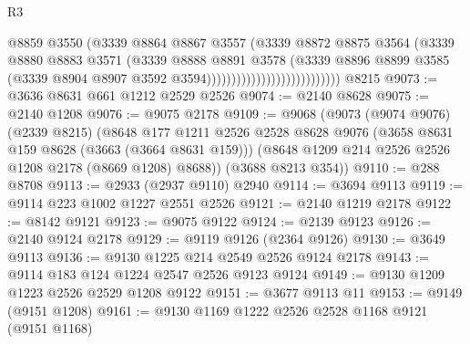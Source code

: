 \begin{lexlean}{R3}
\begin{coremodule}
                                              @8859
                                              @3550
                                              (@3339
                                                @8864
                                                @8867
                                                @3557
                                                (@3339
                                                  @8872
                                                  @8875
                                                  @3564
                                                  (@3339
                                                    @8880
                                                    @8883
                                                    @3571
                                                    (@3339
                                                      @8888
                                                      @8891
                                                      @3578
                                                      (@3339
                                                        @8896
                                                        @8899
                                                        @3585
                                                        (@3339
                                                          @8904
                                                          @8907
                                                          @3592
                                                          @3594)))))))))))))))))))))))))))
    @8215
@9073 := @3636 @8631 @661 @1212 @2529 @2526
@9074 := @2140 @8628
@9075 := @2140 @1208
@9076 := @9075 @2178
@9109 := @9068
    (@9073
      (@9074 @9076)
      (@2339 @8215)
      (@8648
        @177
        @1211
        @2526
        @2528
        @8628
        @9076
        (@3658 @8631 @159 @8628 (@3663 (@3664 @8631 @159)))
        (@8648 @1209 @214 @2526 @2526 @1208 @2178 (@8669 @1208) @8688))
      (@3688 @8213 @354))
@9110 := @288 @8708
@9113 := @2933 (@2937 @9110) @2940
@9114 := @3694 @9113
@9119 := @9114 @223 @1002 @1227 @2551 @2526
@9121 := @2140 @1219 @2178
@9122 := @8142 @9121
@9123 := @9075 @9122
@9124 := @2139 @9123
@9126 := @2140 @9124 @2178
@9129 := @9119 @9126 (@2364 @9126)
@9130 := @3649 @9113
@9136 := @9130 @1225 @214 @2549 @2526 @9124 @2178
@9143 := @9114 @183 @124 @1224 @2547 @2526 @9123 @9124
@9149 := @9130 @1209 @1223 @2526 @2529 @1208 @9122
@9151 := @3677 @9113 @11
@9153 := @9149 (@9151 @1208)
@9161 := @9130 @1169 @1222 @2526 @2528 @1168 @9121 (@9151 @1168)

\end{coremodule}
\end{lexlean}
